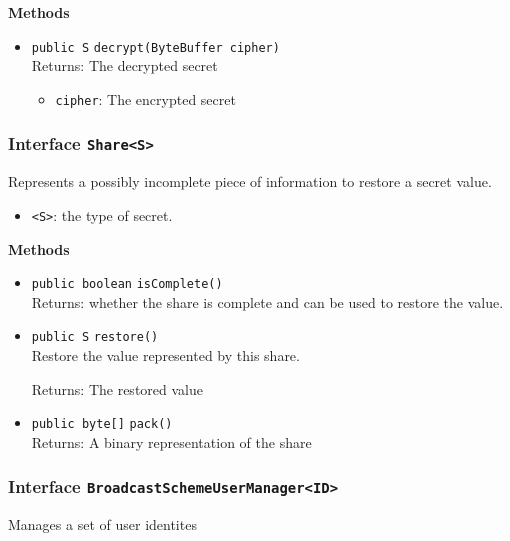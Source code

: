\textbf{Methods}
\begin{itemize}
\item \lstinline|public S| \lstinline|decrypt|\lstinline|(ByteBuffer cipher)|\\
Returns: The decrypted secret
\begin{itemize}
\item \lstinline|cipher|: The encrypted secret
\end{itemize}



\end{itemize}

\subsubsection{Interface \lstinline|Share<S>|}
Represents a possibly incomplete piece of information to restore a secret value. \\


\begin{itemize}
\item \lstinline|<S>|: the type of secret.
\end{itemize}



\textbf{Methods}
\begin{itemize}
\item \lstinline|public boolean| \lstinline|isComplete|\lstinline|()|\\
Returns: whether the share is complete and can be used to restore
 the value.



\item \lstinline|public S| \lstinline|restore|\lstinline|()|\\
Restore the value represented by this share.

Returns: The restored value

\item \lstinline|public byte[]| \lstinline|pack|\lstinline|()|\\
Returns: A binary representation of the share



\end{itemize}

\subsubsection{Interface \lstinline|BroadcastSchemeUserManager<ID>|}
Manages a set of user identites \\


